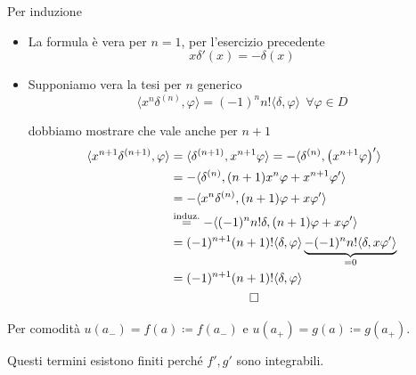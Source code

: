Per induzione
\begin{itemize}
\item La formula è vera per $n = 1$, per l'esercizio precedente
\begin{equation*}
x\delta '(x) = - \delta (x)
\end{equation*}
\item Supponiamo vera la tesi per $n$ generico
\begin{equation*}
\langle x^{n} \delta ^{(n)} ,\varphi \rangle = (- 1)^{n} n!\langle \delta ,\varphi \rangle \ \ \forall \varphi \in D
\end{equation*}

dobbiamo mostrare che vale anche per $n + 1$
\begin{gather*}
\begin{aligned}
\langle x^{n + 1} \delta ^{(n + 1)} ,\varphi \rangle  & = \langle \delta ^{(n + 1)} ,x^{n + 1} \varphi \rangle = - \langle \delta ^{(n)} ,\left(x^{n + 1} \varphi \right) '\rangle \\
 & = - \langle \delta ^{(n)} ,(n + 1) x^{n} \varphi + x^{n + 1} \varphi '\rangle \\
 & = - \langle x^{n} \delta ^{(n)} ,(n + 1) \varphi + x\varphi '\rangle \\
 & \overset{\text{induz.}}{ = } - \langle (- 1)^{n} n!\delta ,(n + 1) \varphi + x\varphi '\rangle \\
 & = (- 1)^{n + 1}(n + 1) !\langle \delta ,\varphi \rangle \underbrace{ - (- 1)^{n} n!\langle \delta ,x\varphi '\rangle }_{ = 0}\\
 & = (- 1)^{n + 1}(n + 1) !\langle \delta ,\varphi \rangle 
\end{aligned}\\
\qed 
\end{gather*}
\end{itemize}
\Soluzione

Per comodità $u(a_{ - }) = f(a) \coloneqq f(a_{ - })$ e $u(a_{ + }) = g(a) \coloneqq g(a_{ + })$.

Questi termini esistono finiti perché $f',g'$ sono integrabili.

